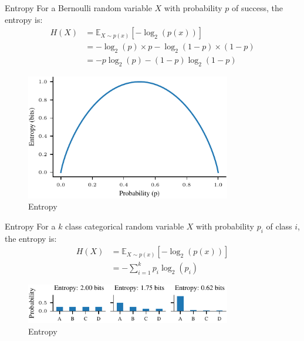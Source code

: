 \documentclass[handout]{beamer}
\begin{document}
\begin{frame}{Entropy}
    For a Bernoulli random variable $X$ with probability $p$ of success, the entropy is:
    \begin{align*}
        H(X) &= \mathbb{E}_{X \sim p(x)}[-\log_2(p(x))] \\
        &= -\log_2(p) \times p - \log_2(1-p) \times (1-p) \\
        &= -p\log_2(p) - (1-p)\log_2(1-p)
    \end{align*}
    \begin{figure}
        \centering
        \includegraphics[width=0.8\textwidth]{../figures/information-theory/entropy-bernoulli.pdf}
        \caption{Entropy}
        \label{fig:entropy}
    \end{figure}
    
\end{frame}

\begin{frame}{Entropy}
    For a $k$ class categorical random variable $X$ with probability $p_i$ of class $i$, the entropy is:
    \begin{align*}
        H(X) &= \mathbb{E}_{X \sim p(x)}[-\log_2(p(x))] \\
        &= -\sum_{i=1}^k p_i \log_2(p_i)
    \end{align*}

    \begin{figure}
        \centering
        \includegraphics[width=0.8\textwidth]{../figures/information-theory/categorical-entropy.pdf}
        \caption{Entropy}
        \label{fig:entropy_categorical}
    \end{figure}
    
\end{frame}
\end{document}
